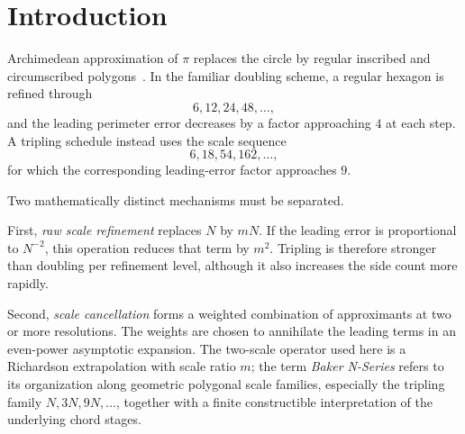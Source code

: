 \documentclass[12pt]{article}
\theoremstyle{definition}
\theoremstyle{remark}
\newcommand{\abs}[1]{\left|#1\right|}
\begin{document}
\begin{abstract}
The finite canonical scale-$3$ computation is now accompanied by a rigorous,
oracle-free error certificate.  Eleven polygon inputs are enclosed by exact
rational cubic-root intervals, propagated through the complete Richardson
tableau with exact rational weights, and combined with an analytic alternating-
series remainder using only the rational inequality $\pi<22/7$.  For the
specified $120$-decimal working-precision run, the resulting bound is
\[
  \abs{\widehat\pi_g-\pi}
  <3.406285758314118\times10^{-81},
\]
which certifies at least $80$ decimal places of absolute accuracy.  A separate
million-digit comparison with an independently generated Chudnovsky expansion
remains a large-scale implementation test; it is not claimed as a million-digit
formal enclosure.
\end{abstract}

\section{Introduction}

Archimedean approximation of $\pi$ replaces the circle by regular inscribed and
circumscribed polygons~\cite{archimedes}.  In the familiar doubling scheme, a regular hexagon is
refined through
\[
  6,12,24,48,\ldots,
\]
and the leading perimeter error decreases by a factor approaching $4$ at each
step.  A tripling schedule instead uses the scale sequence
\[
  6,18,54,162,\ldots,
\]
for which the corresponding leading-error factor approaches $9$.

Two mathematically distinct mechanisms must be separated.

First, \emph{raw scale refinement} replaces $N$ by $mN$.  If the leading error
is proportional to $N^{-2}$, this operation reduces that term by $m^2$.
Tripling is therefore stronger than doubling per refinement level, although it
also increases the side count more rapidly.

Second, \emph{scale cancellation} forms a weighted combination of approximants
at two or more resolutions.  The weights are chosen to annihilate the leading
terms in an even-power asymptotic expansion.  The two-scale operator used here
is a Richardson extrapolation with scale ratio $m$; the term \emph{Baker
N-Series} refers to its organization along geometric polygonal scale families,
especially the tripling family $N,3N,9N,\ldots$, together with a finite
constructible interpretation of the underlying chord stages.
\end{document}
